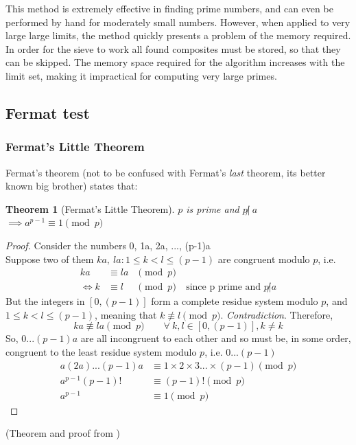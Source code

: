 \documentclass[12pt, titlepage]{article}
\newtheorem{theorem}{Theorem}
\begin{document}
    This method is extremely effective in finding prime numbers, and can even be performed
    by hand for moderately small numbers. However, when applied to very large large limits,
    the method quickly presents a problem of the memory required. In order for the sieve to
    work all found composites must be stored, so that they can be skipped. The memory space
    required for the algorithm increases with the limit set, making it impractical for
    computing very large primes.

           
    \subsection{Fermat test}
    \label{sec:fermat}

        \subsubsection{Fermat's Little Theorem}
        Fermat's theorem (not to be confused with Fermat's \emph{last} theorem, its better known
        big brother) states that:
        \begin{theorem}[Fermat's Little Theorem]
            $p$ is prime and $p \not|\ a$ $\implies a^{p-1} \equiv 1 \pmod{p}$
        \end{theorem}

        \begin{proof}
            Consider the numbers 0, 1a, 2a, ..., (p-1)a\\
            Suppose two of them $ka,\ la: 1\leq k < l \leq (p-1)$ are congruent modulo $p$, i.e.        %
            \begin{align*}
                      ka &\equiv la &\pmod{p}&\\
                \iff  k  &\equiv l  &\pmod{p}&\ \text{since p prime and $p \not| a$}
            \end{align*}
            But the integers in $[0, (p-1)]$ form a complete residue system modulo $p$, and  $1
            \leq k<l \leq (p-1)$, meaning that $k \not\equiv l \pmod p$. \emph{Contradiction}.
            Therefore,
            \begin{equation*}
                ka \not\equiv la \pmod{p}\qquad \forall\ k,l \in [0, (p-1)], k \not= k
            \end{equation*}
            So, $0...(p-1)a$ are all incongruent to each other and so must be, in some order,
            congruent to the least residue system modulo $p$, i.e.  $0...(p-1)$
            \begin{align*}
                a(2a)...(p-1)a &\equiv 1\times 2\times 3...\times (p-1) \pmod{p}\\
                a^{p-1}(p-1)!  &\equiv (p-1)!                           \pmod{p}\\
                a^{p-1}        &\equiv 1                                \pmod{p}
            \end{align*}
        \end{proof}
        (Theorem and proof from \cite[109]{dence})
\end{document}
